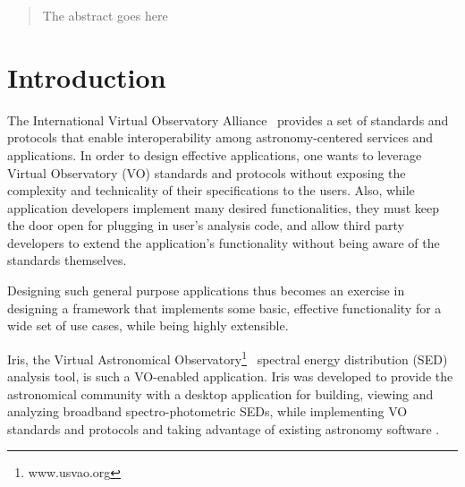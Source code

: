 \documentclass[5p]{elsarticle}
\begin{document}
\begin{frontmatter}
\address[sao]{Smithsonian Astrophysical Observatory, 60 Garden St.
Cambridge, MA 02138}
\address[stsci]{Space Telescope Science Institute, 3700 San Martin Dr.
Baltimore, MD 21218}
\address[ipac]{Infrared Processing and Analysis Center, 770 South Wilson Ave.
Pasadena, CA 91125}
\address[noao]{National Optical Astronomy Observatory, 950 N Cherry Ave.
Tucson, AZ 85719}



\begin{abstract}
The abstract goes here

\end{abstract}







\end{frontmatter}




\label{sec:introduction}
\section{Introduction} 
The International Virtual Observatory Alliance~\citep{2004SPIE.5493..137Q} provides a set of standards and protocols that enable interoperability among astronomy-centered services and applications.
In order to design effective applications, one wants to leverage Virtual Observatory (VO) standards and protocols without exposing the complexity and technicality of their specifications to the users. Also, while application developers implement many desired functionalities, they must keep the door open for plugging in user's analysis code, and allow third party developers to extend the application's functionality without being aware of the standards themselves.

Designing such general purpose applications thus becomes an exercise in designing a framework that implements some basic, effective functionality for a wide set of use cases, while being highly extensible.

Iris, the Virtual Astronomical Observatory\footnote{www.usvao.org}~\citep{2012SPIE.8449E..0HB} spectral energy distribution (SED) analysis tool, is such a VO-enabled application. Iris was developed to provide the astronomical community with a desktop application for building, viewing and analyzing broadband spectro-photometric SEDs, while implementing VO standards and protocols and taking advantage of existing astronomy software \citep{2012ASPC..461..893D,2013AAS...22124038L}.
\end{document}
